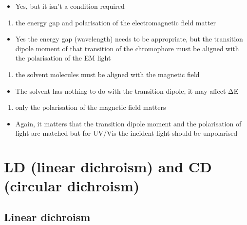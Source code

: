 \documentclass[
]{book}
\providecommand{\tightlist}{%
  \setlength{\itemsep}{0pt}\setlength{\parskip}{0pt}}
\begin{document}
\begin{itemize}
\tightlist
\item
  Yes, but it isn't a condition required
\end{itemize}

\begin{enumerate}
\def\labelenumi{\alph{enumi}.}
\setcounter{enumi}{3}
\tightlist
\item
  { the energy gap and polarisation of the electromagnetic field matter }
\end{enumerate}

\begin{itemize}
\tightlist
\item
  Yes the energy gap (wavelength) needs to be appropriate, but the transition dipole moment of that transition of the chromophore must be aligned with the polarisation of the EM light
\end{itemize}

\begin{enumerate}
\def\labelenumi{\alph{enumi}.}
\setcounter{enumi}{4}
\tightlist
\item
  the solvent molecules must be aligned with the magnetic field
\end{enumerate}

\begin{itemize}
\tightlist
\item
  The solvent has nothing to do with the transition dipole, it may affect ΔE
\end{itemize}

\begin{enumerate}
\def\labelenumi{\alph{enumi}.}
\setcounter{enumi}{5}
\tightlist
\item
  only the polarisation of the magnetic field matters
\end{enumerate}

\begin{itemize}
\tightlist
\item
  Again, it matters that the transition dipole moment and the polarisation of light are matched but for UV/Vis the incident light should be unpolarised
\end{itemize}

\hypertarget{ch:LDCD}{%
\chapter{LD (linear dichroism) and CD (circular dichroism)}\label{ch:LDCD}}

\hypertarget{sec:LD}{%
\section{Linear dichroism}\label{sec:LD}}
\end{document}
